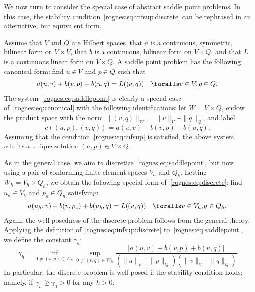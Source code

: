 We now turn to consider the special case of abstract saddle point
problems. In this case, the stability
condition~\eqref{rognes:eq:infsup:discrete} can be rephrased in an
alternative, but equivalent form.

Assume that $V$ and $Q$ are Hilbert spaces, that $a$ is a continuous,
symmetric, bilinear form on $V \times V$, that $b$ is a continuous,
bilinear form on $V \times Q$, and that $L$ is a continuous linear
form on $V \times Q$. A saddle point problem has the following
canonical form: find $u
\in V$ and $p \in Q$ such that
\begin{equation}
    \label{rognes:eq:saddlepoint}
    a(u, v) + b(v, p) + b(u, q) = L((v, q))
    \quad \foralls v \in V, q \in Q.
\end{equation}
The system~\eqref{rognes:eq:saddlepoint} is clearly a special case
of~\eqref{rognes:eq:canonical} with the following identifications: let
$W = V \times Q$, endow the product space with the norm $\|(v,
q)\|_{W} = \|v\|_{V} + \|q\|_{Q}$, and label
\begin{equation}
  c((u, p), (v, q)) = a(u, v) + b(v, p) + b(u, q).
\end{equation}
Assuming that the condition~\eqref{rognes:eq:infsup} is satisfied, the
above system admits a unique solution $(u, p) \in V \times Q$.

As in the general case, we aim to
discretize~\eqref{rognes:eq:saddlepoint}, but now using a pair of
conforming finite element spaces $V_h$ and $Q_h$. Letting $W_h = V_h
\times Q_h$, we obtain the following special form
of~\eqref{rognes:eq:discrete}: find $u_h \in V_h$ and $p_h \in Q_h$
satisfying:
\begin{equation}
    \label{rognes:eq:saddlepoint:discrete}
    a(u_h, v) + b(v, p_h) + b(u_h, q) = L((v, q))
    \quad \foralls v \in V_h, q \in Q_h.
\end{equation}
Again, the well-posedness of the discrete problem follows from the
general theory. Applying the definition
of~\eqref{rognes:eq:infsup:discrete} to~\eqref{rognes:eq:saddlepoint},
we define the \babuska{} constant $\gamma_h$:
\begin{equation}
  \label{rognes:eq:Babuska}
  \gamma_h = \inf_{0 \not = (u, p) \in W_h} \sup_{0 \not = (v, q) \in W_h}
  \frac{|a(u, v) + b(v, p) + b(u, q)|} {(\|u\|_{V} + \|p\|_{Q})
    (\|v\|_{V} + \|q\|_{Q})}
\end{equation}
In particular, the discrete problem is well-posed if the \babuska{}
stability condition holds; namely, if $\gamma_h \geqslant \gamma_0 >
0$ for any $h > 0$.

